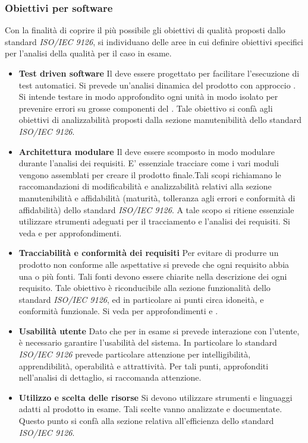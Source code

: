 \documentclass[12pt,a4paper]{article}
\begin{document}
\subsubsection{Obiettivi per software}
Con la finalità di coprire il più possibile gli obiettivi di qualità proposti dallo standard  \textit{ISO/IEC 9126}, si individuano delle aree in cui definire obiettivi specifici per l'analisi della qualità  per il caso in esame.
\begin{itemize}
	\item{\textbf{Test driven software}}
	Il  deve essere progettato per facilitare l'esecuzione di test automatici. Si prevede un'analisi dinamica del prodotto con approccio . Si intende testare in modo approfondito ogni unità  in modo isolato per prevenire errori su grosse componenti del . Tale obiettivo si confà agli obiettivi di analizzabilità proposti dalla sezione manutenibilità dello standard \textit{ISO/IEC 9126}.
	\item{\textbf{Architettura modulare}}
	Il  deve essere scomposto in modo modulare durante l'analisi dei requisiti. E' essenziale tracciare come i vari moduli vengono assemblati per creare il prodotto finale.Tali scopi richiamano le raccomandazioni di modificabilità e analizzabilità relativi alla sezione manutenibilità e affidabilità (maturità, tolleranza agli errori e conformità di affidabilità) dello standard \textit{ISO/IEC 9126}. A tale scopo si ritiene essenziale utilizzare strumenti adeguati per il tracciamento e l'analisi dei requisiti. Si veda \NdP{} e \AdR{} per approfondimenti.
	\item{\textbf{Tracciabilità e conformità dei requisiti}}
	Per evitare di produrre un prodotto non conforme alle aspettative si prevede che ogni requisito  abbia una o più fonti. Tali fonti devono essere chiarite nella descrizione dei ogni requisito. Tale obiettivo è riconducibile alla sezione funzionalità dello standard  \textit{ISO/IEC 9126}, ed in particolare ai punti circa idoneità, e conformità funzionale. Si veda per approfondimenti \NdP{} e \AdR{}.
	\item{\textbf{Usabilità utente}}
	Dato che per  in esame si prevede interazione con l'utente, è necessario garantire l'usabilità del sistema. In particolare lo standard \textit{ISO/IEC 9126} prevede particolare attenzione per intelligibilità, apprendibilità, operabilità e attrattività. Per tali punti, approfonditi nell'analisi di dettaglio, si raccomanda attenzione.
	\item{\textbf{Utilizzo e scelta delle risorse}}
	Si devono utilizzare strumenti e linguaggi adatti al prodotto in esame. Tali scelte vanno analizzate e documentate. Questo punto si confà alla sezione relativa all'efficienza dello standard \textit{ISO/IEC 9126}.
\end{itemize}
\end{document}
